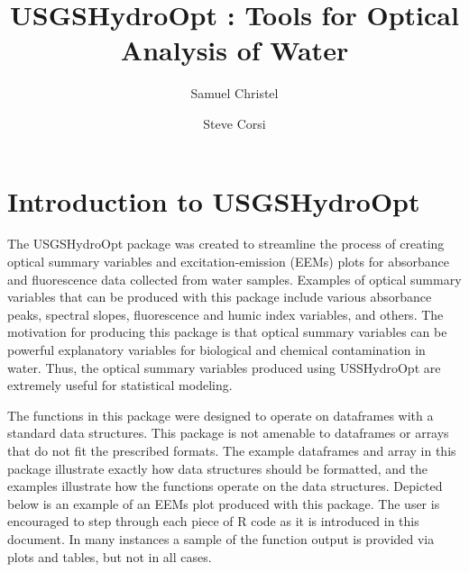 \documentclass[a4paper,11pt]{article}\usepackage[]{graphicx}\usepackage[]{color}
\begin{document}
\title{USGSHydroOpt : Tools for Optical Analysis of Water}
\author[1]{Samuel Christel}
\author[1]{Steve Corsi}




\maketitle
\tableofcontents

\section{Introduction to USGSHydroOpt}
The USGSHydroOpt package was created to streamline the process of creating optical summary variables and excitation-emission (EEMs) plots for absorbance and fluorescence data collected from water samples. Examples of optical summary variables that can be produced with this package include various absorbance peaks, spectral slopes, fluorescence and humic index variables, and others. The motivation for producing this package is that optical summary variables can be powerful explanatory variables for biological and chemical contamination in water. Thus, the optical summary variables produced using USSHydroOpt are extremely useful for statistical modeling.

The functions in this package were designed to operate on dataframes with a standard data structures. This package is not amenable to dataframes or arrays that do not fit the prescribed formats. The example dataframes and array in this package illustrate exactly how data structures should be formatted, and the examples illustrate how the functions operate on the data structures. Depicted below is an example of an EEMs plot produced with this package. The user is encouraged to step through each piece of R code as it is introduced in this document. In many instances a sample of the function output is provided via plots and tables, but not in all cases.
\end{document}
